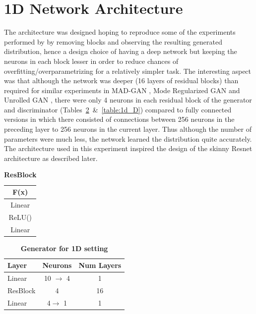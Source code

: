 \documentclass[10pt,twocolumn,letterpaper]{article}
\newcommand{\ow}[1]{\textbf{\textcolor[rgb]{.1, .1, .8}{OW: #1}}}
\begin{document}
\section{1D Network Architecture}
The architecture was designed hoping to reproduce some of the experiments performed by \cite{veit2016residual} by removing blocks and observing the resulting generated distribution, hence a design choice of having a deep network but keeping the neurons in each block lesser in order to reduce chances of overfitting/overparametrizing for a relatively simpler task. The interesting aspect was that although the network was deeper (16 layers of residual blocks) than required for similar experiments in MAD-GAN \cite{ghosh2017multi}, Mode Regularized GAN \cite{che2016mode} and Unrolled GAN \cite{metz2017unrolledGAN}, there were only 4 neurons in each residual block of the generator and discriminator (Tables~\ref{table:1d_G}~\&~\ref{table:1d_D}) compared to fully connected versions in which there consisted of connections between 256 neurons in the preceding layer to 256 neurons in the current layer. Thus although the number of parameters were much less, the network learned the distribution quite accurately. The architecture used in this experiment inspired the design of the skinny Resnet architecture as described later.

\begin{table}[ht]
\caption{\textbf{ResBlock}} %
\centering %
\begin{tabular}{c} %
\toprule
\textbf{F(x)}\\\midrule
Linear\\ %
ReLU() \\
Linear\\
\bottomrule %
\end{tabular}
\label{table:resblock} %
\end{table}

\begin{table}[ht]
\caption{\textbf{Generator for 1D setting}} %
\centering %
\begin{tabular}{l c c}
\toprule
\textbf{Layer} & \textbf{Neurons} & \textbf{Num Layers} \\ \midrule
Linear & 10 $\rightarrow$ 4 & 1  \\ %
ResBlock & 4 & 16 \\ 
Linear & 4$\rightarrow$ 1 & 1 \\ 
\bottomrule %
\end{tabular}
\label{table:1d_G} %
\end{table}
\end{document}
